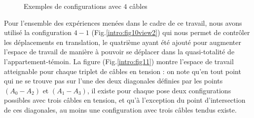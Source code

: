 \begin{figure}[htp]
  \centering
   \hfill
   \hfill
    \caption{\footnotesize{Exemples de configurations avec $4$ câbles}}
\label{intro:fig9}
\end{figure}

Pour l'ensemble des expériences menées dans le cadre de ce travail, nous avons utilisé la configuration $4-1$ (Fig.\ref{intro:fig10view2}) qui nous permet de contrôler les déplacements en translation, le quatrième ayant été ajouté pour augmenter l'espace de travail de manière à pouvoir se déplacer dans la quasi-totalité de l'appartement-témoin. La figure (Fig.\ref{intro:fig11}) montre l'espace de travail atteignable pour chaque triplet de câbles en tension : on note qu'en tout point qui ne se trouve pas sur l'une des deux diagonales définies par les points $(A_0-A_2)$ et $(A_1-A_3)$, il existe pour chaque pose deux configurations possibles avec trois câbles en tension, et qu'à l'exception du point d'intersection de ces diagonales, au moins une configuration avec trois câbles tendus existe.

